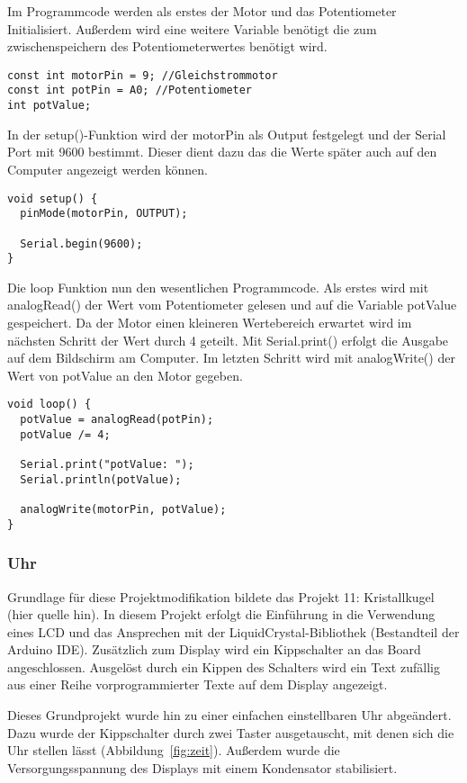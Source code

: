 Im Programmcode werden als erstes der Motor und das Potentiometer Initialisiert. Außerdem wird eine weitere Variable benötigt die zum zwischenspeichern des Potentiometerwertes benötigt wird.
\begin{lstlisting}[language=Arduino]
const int motorPin = 9; //Gleichstrommotor
const int potPin = A0; //Potentiometer
int potValue;
\end{lstlisting}

In der setup()-Funktion wird der motorPin als Output festgelegt und der Serial Port mit 9600 bestimmt. Dieser dient dazu das die Werte später auch auf den Computer angezeigt werden können.
\begin{lstlisting}[language=Arduino]
void setup() {
  pinMode(motorPin, OUTPUT);

  Serial.begin(9600);
}
\end{lstlisting}

Die loop Funktion nun den wesentlichen Programmcode. Als erstes wird mit analogRead() der Wert vom Potentiometer gelesen und auf die Variable potValue gespeichert. Da der Motor einen kleineren Wertebereich erwartet wird im nächsten Schritt der Wert durch 4 geteilt. Mit Serial.print() erfolgt die Ausgabe auf dem Bildschirm am Computer. Im letzten Schritt wird mit analogWrite() der Wert von potValue an den Motor gegeben.
\begin{lstlisting}[language=Arduino]
void loop() {
  potValue = analogRead(potPin);
  potValue /= 4;

  Serial.print("potValue: ");
  Serial.println(potValue);

  analogWrite(motorPin, potValue);
}
\end{lstlisting}



\subsubsection{Uhr}
Grundlage für diese Projektmodifikation bildete das Projekt 11: Kristallkugel (hier quelle hin). In diesem Projekt erfolgt die Einführung in die Verwendung eines LCD und das Ansprechen mit der LiquidCrystal-Bibliothek (Bestandteil der Arduino IDE).
Zusätzlich zum Display wird ein Kippschalter an das Board angeschlossen. Ausgelöst durch ein Kippen des Schalters wird ein Text zufällig aus einer Reihe vorprogrammierter Texte auf dem Display angezeigt.

Dieses Grundprojekt wurde hin zu einer einfachen einstellbaren Uhr abgeändert. Dazu wurde der Kippschalter durch zwei Taster ausgetauscht, mit denen sich die Uhr stellen lässt (Abbildung~\ref{fig:zeit}). Außerdem wurde die Versorgungsspannung des Displays mit einem Kondensator stabilisiert.

